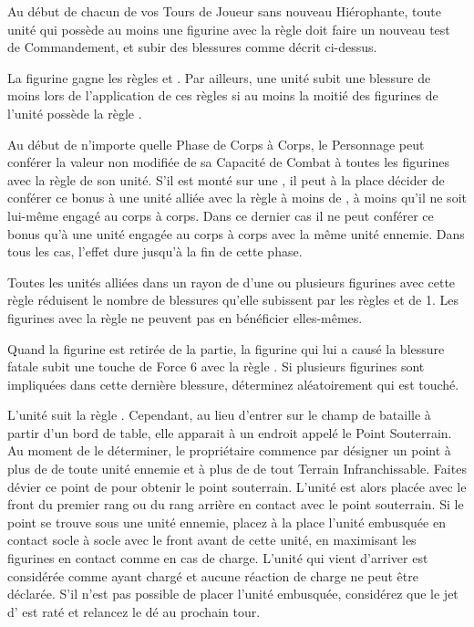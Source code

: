 Au début de chacun de vos Tours de Joueur sans nouveau Hiérophante, toute unité qui possède au moins une figurine avec la règle \dusttodust{} doit faire un nouveau test de Commandement, et subir des blessures comme décrit ci-dessus.

\armyspecialruleentry{\undeadconstruct{}}

La figurine gagne les règles \dusttodust{} et \undead{}. Par ailleurs, une unité subit une blessure de moins lors de l'application de ces règles si au moins la moitié des figurines de l'unité possède la règle \undeadconstruct{}.

\armyspecialruleentry{\undyingwill{}}

Au début de n'importe quelle Phase de Corps à Corps, le Personnage peut conférer la valeur non modifiée de sa Capacité de Combat à toutes les figurines avec la règle \undead{} de son unité. S'il est monté sur une \largetarget{}, il peut à la place décider de conférer ce bonus à une unité alliée avec la règle \undead{} à moins de , à moins qu'il ne soit lui-même engagé au corps à corps. Dans ce dernier cas il ne peut conférer ce bonus qu'à une unité \undead{} engagée au corps à corps avec la même unité ennemie. Dans tous les cas, l'effet dure jusqu'à la fin de cette phase.

\armyspecialruleentry{\necromanticaura{}}

Toutes les unités alliées dans un rayon de  d'une ou plusieurs figurines avec cette règle réduisent le nombre de blessures qu'elle subissent par les règles \dusttodust{} et \unstable{} de 1. Les figurines avec la règle \necromanticaura{} ne peuvent pas en bénéficier elles-mêmes.

\armyspecialruleentry{\mummyscurse{}}

Quand la figurine est retirée de la partie, la figurine qui lui a causé la blessure fatale subit une touche de Force 6 avec la règle . Si plusieurs figurines sont impliquées dans cette dernière blessure, déterminez aléatoirement qui est touché.

\armyspecialruleentry{\undergroundambush{}}

L'unité suit la règle \ambush{}. Cependant, au lieu d'entrer sur le champ de bataille à partir d'un bord de table, elle apparait à un endroit appelé le Point Souterrain. Au moment de le déterminer, le propriétaire commence par désigner un point à plus de  de toute unité ennemie et à plus de  de tout Terrain Infranchissable. Faites dévier ce point de  pour obtenir le point souterrain. L'unité est alors placée avec le front du premier rang ou du rang arrière en contact avec le point souterrain. Si le point se trouve sous une unité ennemie, placez à la place l'unité embusquée en contact socle à socle avec le front avant de cette unité, en maximisant les figurines en contact comme en cas de charge. L'unité qui vient d'arriver est considérée comme ayant chargé et aucune réaction de charge ne peut être déclarée. S'il n'est pas possible de placer l'unité embusquée, considérez que le jet d'\ambush{} est raté et relancez le dé au prochain tour.

